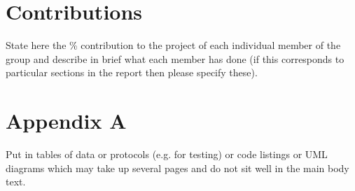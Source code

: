 \documentclass[a4paper, oneside, 11pt]{report}
\begin{document}



\chapter*{Contributions}

State here the \% contribution to the project of each individual member of the group and describe in brief what each member has done (if this corresponds to particular sections in the report then please specify these).

\chapter*{Appendix A}

Put in tables of data or protocols (e.g. for testing) or code listings or UML diagrams which may take up several pages and do not sit well in the main body text.
\end{document}
